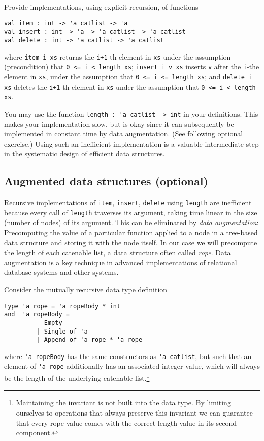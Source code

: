 \documentclass[a4paper,11pt]{article}
\begin{document}
Provide implementations, using explicit recursion, of functions
\begin{verbatim}
val item : int -> 'a catlist -> 'a
val insert : int -> 'a -> 'a catlist -> 'a catlist
val delete : int -> 'a catlist -> 'a catlist
\end{verbatim}
where \verb|item i xs| returns the \verb|i+1|-th element in \verb|xs| under the assumption (precondition) that \verb|0 <= i < length xs|;
\verb|insert i v xs| inserts \verb|v| after the \verb|i|-the element in \verb|xs|, under the assumption that \verb|0 <= i <= length xs|;
and \verb|delete i xs| deletes the \verb|i+1|-th element in \verb|xs| under the assumption that \verb|0 <= i < length xs|.

You may use the function \verb|length : 'a catlist -> int| in your definitions. This makes your implementation slow, but is okay since it can subsequently be implemented in constant time by data augmentation. (See following optional exercise.)  Using such an inefficient implementation is a valuable intermediate step in the systematic design of efficient data structures.
 
\subsection{Augmented data structures (optional)}

Recursive implementations of \verb|item|, \verb|insert|, \verb|delete| using \verb|length| are inefficient because every call of \verb|length| traverses its argument, taking time linear in the size (number of nodes) of its argument.  This can be eliminated by \emph{data augmentation}: Precomputing the value of a particular function applied to a node in a tree-based data structure and storing it with the node itself.  In our case we will precompute the length of each catenable list, a data structure often called \emph{rope}.
Data augmentation is a key technique in advanced implementations of relational database systems and other systems.  

Consider the mutually recursive data type definition
\begin{verbatim}
type 'a rope = 'a ropeBody * int  
and  'a ropeBody = 
           Empty 
         | Single of 'a 
         | Append of 'a rope * 'a rope
\end{verbatim}
where \verb|'a ropeBody| has the same constructors as \verb|'a catlist|, but such that an element of \verb|'a rope| additionally has an associated integer value, which will always be the length of the underlying catenable list.\footnote{Maintaining the invariant is not built into the data type. By limiting ourselves to operations that always preserve this invariant we can guarantee that every rope value comes with the correct length value in its second component.}
\end{document}
